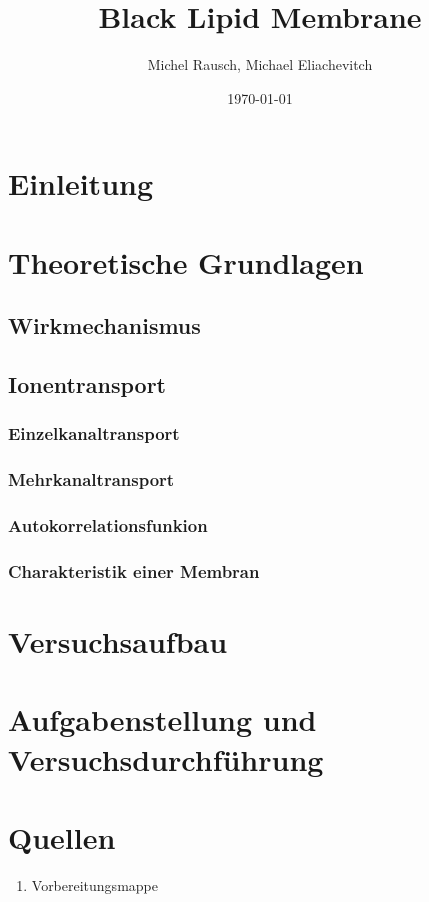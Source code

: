 \documentclass[a4paper,ngerman]{scrartcl}
\title{Black Lipid Membrane}
\date{\today}
\author{Michel Rausch, Michael Eliachevitch}
\begin{document}
\maketitle
\tableofcontents
\newpage

\section{Einleitung}






\section{Theoretische Grundlagen}

\subsection{Wirkmechanismus}


\subsection{Ionentransport}
	

\subsubsection{Einzelkanaltransport}



\subsubsection{Mehrkanaltransport}


\subsubsection{Autokorrelationsfunkion}


\subsubsection{Charakteristik einer Membran}






\section{Versuchsaufbau}








\section{Aufgabenstellung und Versuchsdurchführung}










\section{Quellen}
\begin{enumerate}
\item Vorbereitungsmappe 
\end{enumerate}
\end{document}
